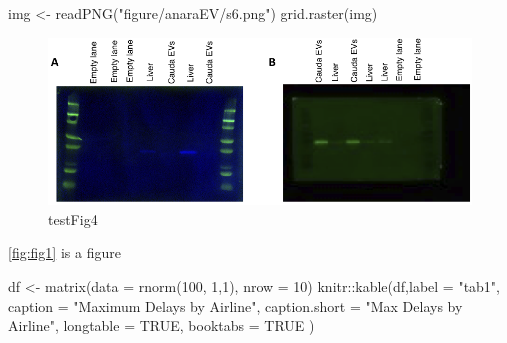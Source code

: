\documentclass[12pt,twoside]{reedthesis}
\newenvironment{Shaded}{\begin{snugshade}}{\end{snugshade}}
\newcommand{\AttributeTok}[1]{\textcolor[rgb]{0.77,0.63,0.00}{#1}}
\newcommand{\ConstantTok}[1]{\textcolor[rgb]{0.00,0.00,0.00}{#1}}
\newcommand{\DecValTok}[1]{\textcolor[rgb]{0.00,0.00,0.81}{#1}}
\newcommand{\FunctionTok}[1]{\textcolor[rgb]{0.00,0.00,0.00}{#1}}
\newcommand{\NormalTok}[1]{#1}
\newcommand{\OtherTok}[1]{\textcolor[rgb]{0.56,0.35,0.01}{#1}}
\newcommand{\SpecialCharTok}[1]{\textcolor[rgb]{0.00,0.00,0.00}{#1}}
\newcommand{\StringTok}[1]{\textcolor[rgb]{0.31,0.60,0.02}{#1}}
\begin{document}
\begin{Shaded}
\begin{Highlighting}[]
\NormalTok{img }\OtherTok{\textless{}{-}} \FunctionTok{readPNG}\NormalTok{(}\StringTok{"figure/anaraEV/s6.png"}\NormalTok{)}
\FunctionTok{grid.raster}\NormalTok{(img)}
\end{Highlighting}
\end{Shaded}
\begin{figure}

{\centering \includegraphics{thesis_files/figure-latex/sfig6-1} 

}

\caption{testFig4}\label{fig:sfig6}
\end{figure}
\ref{fig:fig1} is a figure
\begin{Shaded}
\begin{Highlighting}[]
\NormalTok{df }\OtherTok{\textless{}{-}} \FunctionTok{matrix}\NormalTok{(}\AttributeTok{data =} \FunctionTok{rnorm}\NormalTok{(}\DecValTok{100}\NormalTok{, }\DecValTok{1}\NormalTok{,}\DecValTok{1}\NormalTok{), }\AttributeTok{nrow =} \DecValTok{10}\NormalTok{)}
\NormalTok{knitr}\SpecialCharTok{::}\FunctionTok{kable}\NormalTok{(df,}\AttributeTok{label =} \StringTok{"tab1"}\NormalTok{,}
  \AttributeTok{caption =} \StringTok{"Maximum Delays by Airline"}\NormalTok{,}
  \AttributeTok{caption.short =} \StringTok{"Max Delays by Airline"}\NormalTok{,}
  \AttributeTok{longtable =} \ConstantTok{TRUE}\NormalTok{,}
  \AttributeTok{booktabs =} \ConstantTok{TRUE}
\NormalTok{)}
\end{Highlighting}
\end{Shaded}
\end{document}
